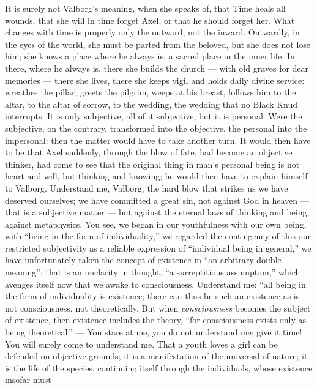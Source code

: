 \documentclass[12pt,a4paper,openany]{book}
\newcommand{\opage}[1]{\marginnote{\footnotesize\textit{[#1]}}}
\begin{document}
It is surely not Valborg's meaning, when she speaks of,
\setcounter{footnote}{0}%
\opage{590}that Time heals all wounds, that she will in time forget
Axel, or that he should forget her. What
changes with time is properly only the outward,
not the inward. Outwardly, in the eyes of the world, she must
be parted from the beloved, but she does not lose him;
she knows a place where he always is, a sacred
place in the inner life. In there, where he always is, there
she builds the church --- with old graves for dear
memories --- there she lives, there she keeps vigil and holds
daily divine service: wreathes the pillar, greets the pilgrim,
weeps at his breast, follows him to the altar,
to the altar of sorrow, to the wedding, the wedding that
no Black Knud interrupts. It is only subjective,
all of it subjective, but it is personal. Were
the subjective, on the contrary, transformed into the objective, the
personal into the impersonal: then the matter would have to take
another turn. It would then have to be that Axel suddenly,
through the blow of fate, had become an objective thinker,
had come to see that the original thing in man's
personal being is not heart and will, but
thinking and knowing; he would then have to explain himself to Valborg.
Understand me, Valborg, the hard blow that strikes
us we have deserved ourselves; we have committed a great
sin, not against God in heaven --- that is a subjective
matter --- but against the eternal laws of thinking and being, against
metaphysics. You see, we began in our youthfulness
with our own being, with ``being in the form of
individuality,'' we regarded the contingency of this our restricted
subjectivity as a reliable expression
of ``individual being in general,'' we have unfortunately
taken the concept of existence in ``an arbitrary
\setcounter{footnote}{0}%
\opage{591}double meaning'': that is an unclarity in thought, ``a surreptitious assumption,''
which avenges itself now that we awake to consciousness.
Understand me: ``all being in the form of individuality
is existence; there can thus be such an existence
as is not consciousness, not theoretically. But when \emph{consciousness}
becomes the subject of existence, then
existence includes the theory, ``for consciousness exists only
as being theoretical.'' --- You stare at me, you
do not understand me; give it time! You will surely come to
understand me. That a youth loves a girl can be defended
on objective grounds; it is a manifestation of
the universal of nature; it is the life of the species, continuing
itself through the individuals, whose existence insofar must
\end{document}
